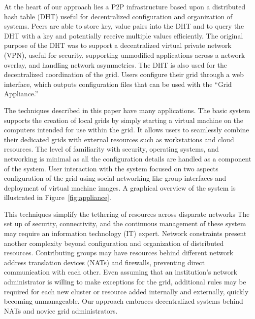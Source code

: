 \documentclass[conference]{IEEEtran}
\begin{document}
At the heart of our approach lies a P2P infrastructure based upon a distributed
hash table (DHT) useful for decentralized configuration and organization of
systems.  Peers are able to store key, value pairs into the DHT and to query
the DHT with a key and potentially receive multiple values efficiently.  The
original purpose of the DHT was to support a decentralized virtual private
network (VPN), useful for security, supporting unmodified applications across a
network overlay, and handling network asymmetries.  The DHT is also used for
the decentralized coordination of the grid.  Users configure their grid through
a web interface, which outputs configuration files that can be used with the
``Grid Appliance.''

The techniques described in this paper have many applications.  The basic
system supports the creation of local grids by simply starting a virtual
machine on the computers intended for use within the grid.  It allows users to
seamlessly combine their dedicated grids with external resources such as
workstations and cloud resources.  The level of familiarity with security,
operating systems, and networking is minimal as all the configuration details
are handled as a component of the system.  User interaction with the system
focused on two aspects configuration of the grid using social networking like
group interfaces and deployment of virtual machine images.  A graphical
overview of the system is illustrated in Figure~\ref{fig:appliance}.

This techniques simplify the tethering of resources across disparate networks
The set up of security, connectivity, and the continuous management of these
system may require an information technology (IT) expert.  Network constraints
present another complexity beyond configuration and organization of distributed
resources.  Contributing groups may have resources behind different network
address translation devices (NATs) and firewalls, preventing direct
communication with each other.  Even assuming that an institution's network
administrator is willing to make exceptions for the grid, additional rules may
be required for each new cluster or resource added internally and externally,
quickly becoming unmanageable.  Our approach embraces decentralized systems
behind NATs and novice grid administrators.

\end{document}
